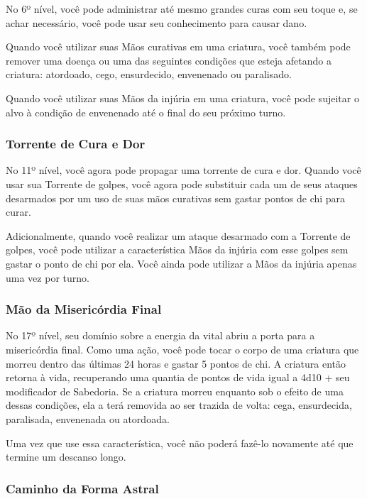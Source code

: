\begin{multicols}{2}
No 6º nível, você pode administrar até mesmo grandes curas com seu toque e, se
achar necessário, você pode usar seu conhecimento para causar dano.

Quando você utilizar suas Mãos curativas em uma criatura, você também pode
remover uma doença ou uma das seguintes condições que esteja afetando a
criatura: atordoado, cego, ensurdecido, envenenado ou paralisado.

Quando você utilizar suas Mãos da injúria em uma criatura, você pode sujeitar o
alvo à condição de envenenado até o final do seu próximo turno.

\subsubsection*{Torrente de Cura e Dor}%
\label{ssub:torrente_de_cura_e_dor}

No 11º nível, você agora pode propagar uma torrente de cura e dor. Quando você
usar sua Torrente de golpes, você agora pode substituir cada um de seus ataques
desarmados por um uso de suas mãos curativas sem gastar pontos de chi para
curar.

Adicionalmente, quando você realizar um ataque desarmado com a Torrente de
golpes, você pode utilizar a característica Mãos da injúria com esse golpes sem
gastar o ponto de chi por ela. Você ainda pode utilizar a Mãos da injúria apenas
uma vez por turno.

\subsubsection*{Mão da Misericórdia Final}%
\label{ssub:mao_da_misericordia_final}

No 17º nível, seu domínio sobre a energia da vital abriu a porta para a
misericórdia final. Como uma ação, você pode tocar o corpo de uma criatura que
morreu dentro das últimas 24 horas e gastar 5 pontos de chi. A criatura então
retorna à vida, recuperando uma quantia de pontos de vida igual a 4d10 + seu
modificador de Sabedoria. Se a criatura morreu enquanto sob o efeito de uma
dessas condições, ela a terá removida ao ser trazida de volta: cega,
ensurdecida, paralisada, envenenada ou atordoada.

Uma vez que use essa característica, você não poderá fazê-lo novamente até que
termine um descanso longo.

\subsubsection*{Caminho da Forma Astral}%
\label{ssub:caminho_da_forma_astral}


\end{multicols}
